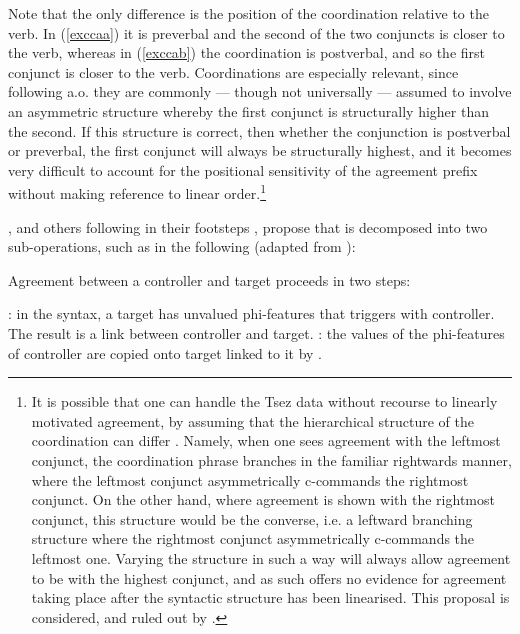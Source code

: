 \documentclass[output=paper
,modfonts
,nonflat]{langsci/langscibook}
\begin{document}
Note that the only difference is the position of the coordination relative to the verb.
In (\ref{exccaa}) it is preverbal and the second of the two conjuncts is closer to the verb, whereas in (\ref{exccab}) the coordination is postverbal, and so the first conjunct is closer to the verb.
Coordinations are especially relevant, since following \citet{munn1993} a.o. they are commonly --- though not universally \citep[see][]{borsley2005} --- assumed to involve an asymmetric structure whereby the first conjunct is structurally higher than the second.
If this structure is correct, then whether the conjunction is postverbal or preverbal, the first conjunct will always be structurally highest, and it becomes very difficult to account for the positional sensitivity of the agreement prefix without making reference to linear order.\footnote{It is possible that one can handle the Tsez data without recourse to linearly motivated agreement, by assuming that the hierarchical structure of the coordination can differ \citep[cf.][]{johannessen1996}.
	Namely, when one sees agreement with the leftmost conjunct, the coordination phrase branches in the familiar rightwards manner, where the leftmost conjunct asymmetrically c-commands the rightmost conjunct.
	On the other hand, where agreement is shown with the rightmost conjunct, this structure would be the converse, i.e. a leftward branching structure where the rightmost conjunct asymmetrically c-commands the leftmost one.
	Varying the structure in such a way will always allow agreement to be with the highest conjunct, and as such offers no evidence for agreement taking place after the syntactic structure has been linearised.
	This proposal is considered, and ruled out by \citet{benmamounetal2009}.}

\citet{benmamounetal2009}, and others following in their footsteps \citep[including a.o.][]{arreginevins2012,bhattwalkow2013,smithdiss,smithagrhierarchy, smithsse},  propose that \agr{} is decomposed into two sub-operations, such as in the following (adapted from \citealp{arreginevins2012}):

\begin{exe}
	\ex
	Agreement between a controller and target proceeds in two steps:
	\begin{xlista}
		\ex \agrl: in the syntax, a target has unvalued phi-features that triggers \agr{} with controller. The result is a link between controller and target.
		\ex \agrc: the values of the phi-features of controller are copied onto target linked to it by \agrl.
	\end{xlista}
\end{exe}
\end{document}
